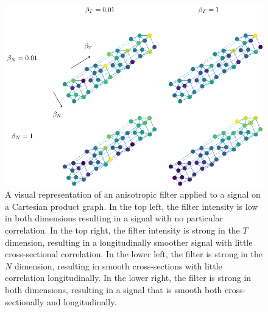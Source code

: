 \clearpage

\vspace*{\fill}

\begin{figure}[h]
    \includegraphics[width=0.95\linewidth]{Figures/2dFilters.pdf}
    \caption[A visual representation of applying an isotropic and anisotropic graph filter]{A visual representation of an anisotropic filter applied to a signal on a Cartesian product graph. In the top left, the filter intensity is low in both dimensions resulting in a signal with no particular correlation. In the top right, the filter intensity is strong in the $T$ dimension, resulting in a longitudinally smoother signal with little cross-sectional correlation. In the lower left, the filter is strong in the $N$ dimension, resulting in smooth cross-sections with little correlation longitudinally. In the lower right, the filter is strong in both dimensions, resulting in a signal that is smooth both cross-sectionally and longitudinally. }
    \label{fig:filters}
\end{figure}

\vspace*{\fill}


\clearpage

